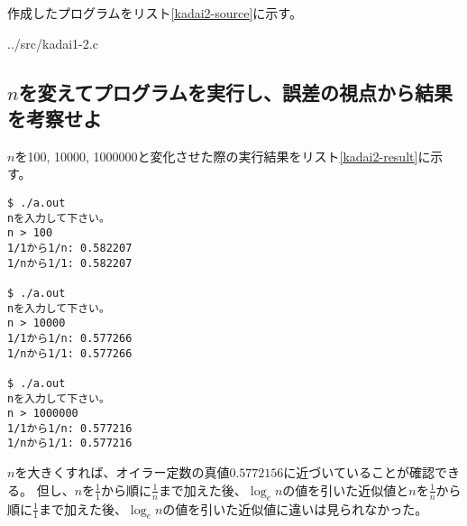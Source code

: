 \documentclass[]{jsarticle}
\begin{document}
作成したプログラムをリスト\ref{kadai2-source}に示す。


{../src/kadai1-2.c}

\subsection{$n$を変えてプログラムを実行し、誤差の視点から結果を考察せよ}

$n$を100, 10000, 1000000と変化させた際の実行結果をリスト\ref{kadai2-result}に示す。

\begin{lstlisting}[caption=実行結果,label=kadai2-result]
$ ./a.out
nを入力して下さい。
n > 100
1/1から1/n: 0.582207
1/nから1/1: 0.582207

$ ./a.out
nを入力して下さい。
n > 10000
1/1から1/n: 0.577266
1/nから1/1: 0.577266

$ ./a.out
nを入力して下さい。
n > 1000000
1/1から1/n: 0.577216
1/nから1/1: 0.577216
\end{lstlisting}

$n$を大きくすれば、オイラー定数の真値$0.5772156$に近づいていることが確認できる。
但し、$n$を$\frac{1}{1}$から順に$\frac{1}{n}$まで加えた後、$\log_{e}n$の値を引いた近似値と$n$を$\frac{1}{n}$から順に$\frac{1}{1}$まで加えた後、$\log_{e}n$の値を引いた近似値に違いは見られなかった。
\end{document}
